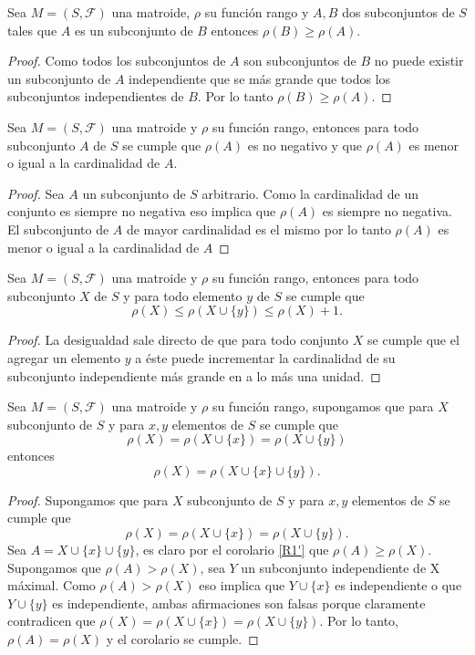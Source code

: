 \begin{cor}\label{R2'}
Sea $M=(S,\mathcal{F})$ una matroide, $\rho$ su función rango y $A,B$ dos subconjuntos de $S$ tales que $A$ es un subconjunto de $B$ entonces $\rho(B) \geq \rho(A)$.
\end{cor}
\begin{proof}
Como todos los subconjuntos de $A$ son subconjuntos de $B$ no puede existir un subconjunto de $A$ independiente que se más grande que todos los subconjuntos independientes de $B$. Por lo tanto $\rho(B) \geq \rho(A)$.
\end{proof}

\begin{cor} \label{R1'}
Sea $M=(S,\mathcal{F})$ una matroide y $\rho$ su función rango, entonces para todo subconjunto $A$ de $S$ se cumple que $\rho (A)$ es no negativo y que $\rho(A)$ es menor o igual a la cardinalidad de $A$.
\end{cor}

\begin{proof}
Sea $A$ un subconjunto de $S$ arbitrario. 
Como la cardinalidad de un conjunto es siempre no negativa eso implica que $\rho(A)$ es siempre no negativa. El subconjunto de $A$ de mayor cardinalidad es el mismo por lo tanto $\rho(A)$ es menor o igual a la cardinalidad de $A$
\end{proof}

\begin{cor} \label{R2}
Sea $M=(S,\mathcal{F})$ una matroide y $\rho$ su función rango, entonces para todo subconjunto $X$ de $S$ y para todo elemento $y$ de $S$ se cumple que
$$\rho(X) \leq \rho(X \cup \{y\}) \leq \rho(X)+1.$$
\end{cor} 

\begin{proof}
La desigualdad sale directo de que para todo conjunto $X$ se cumple que el agregar un elemento $y$ a éste puede incrementar la cardinalidad de su subconjunto independiente más grande en a lo más una unidad.
\end{proof}

\begin{cor} \label{R3}
Sea $M=(S,\mathcal{F})$ una matroide y $\rho$ su función rango, supongamos que para $X$ subconjunto de $S$ y para $x,y$ elementos de $S$ se cumple que 
$$\rho(X)=\rho(X \cup \{ x\}) =\rho(X \cup \{ y\}) $$ 
entonces 
$$\rho(X)=\rho(X \cup \{ x\} \cup \{ y\}).$$
\end{cor}

\begin{proof}
Supongamos que para $X$ subconjunto de $S$ y para $x,y$ elementos de $S$ se cumple que 
$$\rho(X)=\rho(X \cup \{ x\}) =\rho(X \cup \{ y\}). $$ 
Sea $A = X \cup \{ x\} \cup \{ y\}$, es claro por el corolario \ref{R1'} que $\rho(A) \geq \rho(X)$. Supongamos que $\rho(A) > \rho(X)$, sea $Y$ un subconjunto independiente de X máximal. Como $\rho(A) > \rho(X)$ eso implica que $Y \cup \{x\}$ es independiente o que $Y \cup \{y\}$ es independiente, ambas afirmaciones son falsas porque claramente contradicen que $\rho(X)=\rho(X \cup \{ x\}) =\rho(X \cup \{ y\})$. Por lo tanto, $\rho(A) = \rho(X)$ y el corolario se cumple. 
\end{proof}

